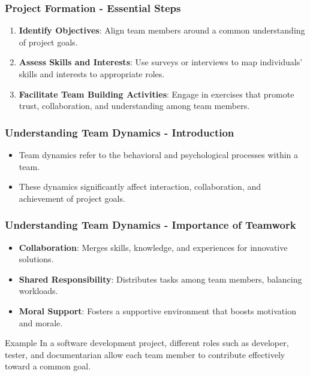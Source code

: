 \documentclass[aspectratio=169]{beamer}
\begin{document}
\begin{frame}[fragile]
    \frametitle{Project Formation - Essential Steps}
    \begin{enumerate}
        \item \textbf{Identify Objectives}: Align team members around a common understanding of project goals.
        \item \textbf{Assess Skills and Interests}: Use surveys or interviews to map individuals’ skills and interests to appropriate roles.
        \item \textbf{Facilitate Team Building Activities}: Engage in exercises that promote trust, collaboration, and understanding among team members.
    \end{enumerate}
    
\end{frame}

\begin{frame}[fragile]
    \frametitle{Understanding Team Dynamics - Introduction}
    \begin{itemize}
        \item Team dynamics refer to the behavioral and psychological processes within a team.
        \item These dynamics significantly affect interaction, collaboration, and achievement of project goals.
    \end{itemize}
\end{frame}

\begin{frame}[fragile]
    \frametitle{Understanding Team Dynamics - Importance of Teamwork}
    \begin{itemize}
        \item \textbf{Collaboration}: Merges skills, knowledge, and experiences for innovative solutions.
        \item \textbf{Shared Responsibility}: Distributes tasks among team members, balancing workloads.
        \item \textbf{Moral Support}: Fosters a supportive environment that boosts motivation and morale.
    \end{itemize}
    
    \begin{block}{Example}
        \small
        In a software development project, different roles such as developer, tester, and documentarian allow each team member to contribute effectively toward a common goal.
    \end{block}
\end{frame}
\end{document}
